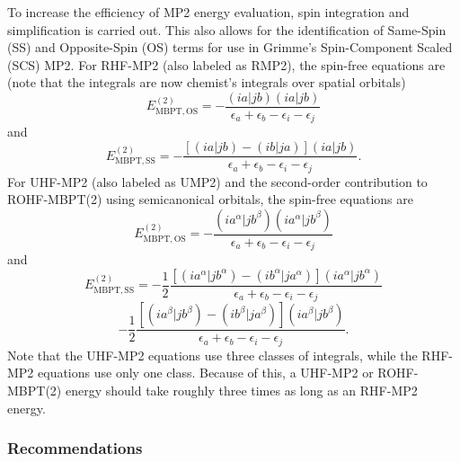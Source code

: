 To increase the efficiency of MP2 energy evaluation, spin integration
and simplification is carried out. This also allows for the identification of
Same-Spin (SS) and Opposite-Spin (OS) terms for use in Grimme's Spin-Component
Scaled (SCS) MP2. For RHF-MP2 (also labeled as RMP2), the spin-free equations are
(note that the integrals are now chemist's integrals over spatial orbitals)
\begin{equation}
E_{\mathrm{MBPT,OS}}^{(2)} = - \frac{(ia|jb)(ia|jb)}{\epsilon_a + \epsilon_b - \epsilon_i - \epsilon_j}
\end{equation}
and 
\begin{equation}
E_{\mathrm{MBPT,SS}}^{(2)} = - \frac{[(ia|jb)-(ib|ja)](ia|jb)}{\epsilon_a + \epsilon_b - \epsilon_i - \epsilon_j}.
\end{equation}
For UHF-MP2 (also labeled as UMP2) and the second-order contribution to ROHF-MBPT(2) using semicanonical orbitals, the spin-free equations are
\begin{equation}
E_{\mathrm{MBPT,OS}}^{(2)} = - \frac{(ia^\alpha|jb^\beta)(ia^\alpha|jb^\beta)}{\epsilon_a + \epsilon_b - \epsilon_i - \epsilon_j}
\end{equation}
and 
\begin{equation}
E_{\mathrm{MBPT,SS}}^{(2)} = - \frac{1}{2}\frac{[(ia^\alpha|jb^\alpha)-(ib^\alpha|ja^\alpha)](ia^\alpha|jb^\alpha)}{\epsilon_a + \epsilon_b - \epsilon_i - \epsilon_j}
\end{equation}
\[
                           - \frac{1}{2}\frac{[(ia^\beta|jb^\beta)-(ib^\beta|ja^\beta)](ia^\beta|jb^\beta)}{\epsilon_a + \epsilon_b - \epsilon_i - \epsilon_j}.
\]
Note that the UHF-MP2 equations use three classes of integrals, while the
RHF-MP2 equations use only one class. Because of this, a UHF-MP2 or
ROHF-MBPT(2) energy should take roughly three times as long as an RHF-MP2
energy.

\subsubsection{Recommendations}

